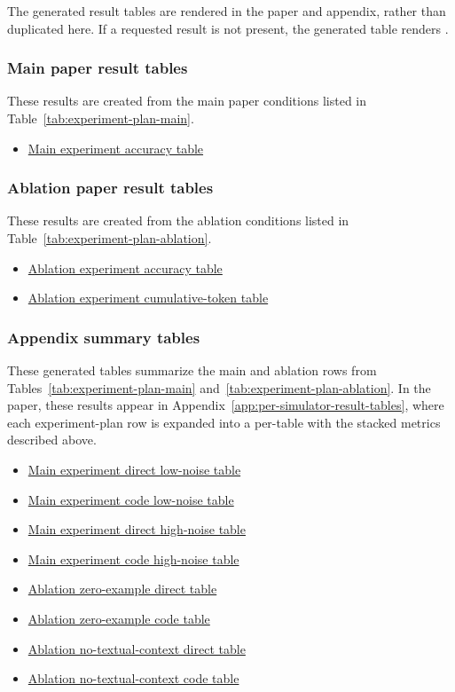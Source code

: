 \documentclass[11pt]{article}
\begin{document}
The generated result tables are rendered in the paper and appendix, rather than duplicated here.
If a requested result is not present, the generated table renders \code{-}.

\subsubsection*{Main paper result tables}
These results are created from the main paper conditions listed in Table~\ref{tab:experiment-plan-main}.
\begin{itemize}
  \item \hyperref[tab:acc_main_experiment_table]{Main experiment accuracy table}
\end{itemize}

\subsubsection*{Ablation paper result tables}
These results are created from the ablation conditions listed in Table~\ref{tab:experiment-plan-ablation}.
\begin{itemize}
  \item \hyperref[tab:acc_ablation_training_examples]{Ablation experiment accuracy table}
  \item \hyperref[tab:cum-ablation-training-examples]{Ablation experiment cumulative-token table}
\end{itemize}

\subsubsection*{Appendix summary tables}
These generated tables summarize the main and ablation rows from Tables~\ref{tab:experiment-plan-main} and~\ref{tab:experiment-plan-ablation}.
In the paper, these results appear in Appendix~\ref{app:per-simulator-result-tables}, where each experiment-plan row is expanded into a per-\termSimulator table with the stacked metrics described above.
\begin{itemize}
  \item \hyperref[tab:app-per-simulator-gentle-01234-cloud]{Main experiment direct low-noise table}
  \item \hyperref[tab:app-per-simulator-gentle-01234-flame]{Main experiment code low-noise table}
  \item \hyperref[tab:app-per-simulator-gentle-01234-pine]{Main experiment direct high-noise table}
  \item \hyperref[tab:app-per-simulator-gentle-01234-orbit]{Main experiment code high-noise table}
  \item \hyperref[tab:app-per-simulator-frost-01234-pine]{Ablation zero-example direct table}
  \item \hyperref[tab:app-per-simulator-frost-01234-orbit]{Ablation zero-example code table}
  \item \hyperref[tab:app-per-simulator-gentle-01234-harbor]{Ablation no-textual-context direct table}
  \item \hyperref[tab:app-per-simulator-gentle-01234-tide]{Ablation no-textual-context code table}
\end{itemize}
\end{document}
